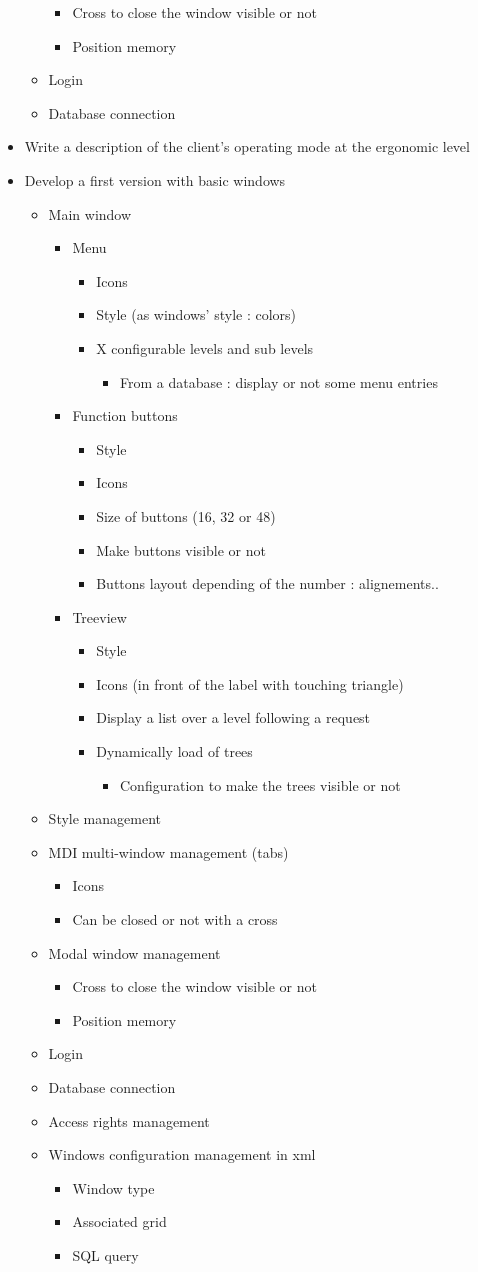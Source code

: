 \documentclass[a4paper, 12pt, french]{article}
\newcommand{\bdot}{\item[\color{ssiYellow}\ding{108}]}
\newcommand{\bdotoutlined}{\item[\color{ssiYellow}\ding{109}]}
\newcommand{\bsquare}{\item[\color{ssiYellow}\ding{110}]}
\newcommand{\bsquareoutlined}{\item[\color{ssiYellow}\ding{111}]}
\newcommand{\bdiamond}{\item[\color{ssiYellow}\ding{117}]}
\begin{document}
\begin{itemize}
\begin{itemize}
\begin{itemize}
								\bsquare{Cross to close the window visible or not}
								\bsquare{Position memory}
							\end{itemize}
						\bdotoutlined{Login}
						\bdotoutlined{Database connection}
					\end{itemize}
				\bdot{Write a description of the client's operating mode at the ergonomic level}
				\bdot{Develop a first version with basic windows}
					\begin{itemize}
						\bdotoutlined{Main window}
							\begin{itemize}
								\bsquare{Menu}
									\begin{itemize}
										\bsquareoutlined{Icons}
										\bsquareoutlined{Style (as windows' style : colors)}
										\bsquareoutlined{X configurable levels and sub levels}
											\begin{itemize}
												\bdiamond{From a database : display or not some menu entries}
											\end{itemize}
									\end{itemize}
								\bsquare{Function buttons}
									\begin{itemize}
										\bsquareoutlined{Style}
										\bsquareoutlined{Icons}
										\bsquareoutlined{Size of buttons (16, 32 or 48)}
										\bsquareoutlined{Make buttons visible or not}
										\bsquareoutlined{Buttons layout depending of the number : alignements..}
									\end{itemize}
								\bsquare{Treeview}
									\begin{itemize}
										\bsquareoutlined{Style}
										\bsquareoutlined{Icons (in front of the label with touching triangle)}
										\bsquareoutlined{Display a list over a level following a request}
										\bsquareoutlined{Dynamically load of trees}
											\begin{itemize}
												\bdiamond{Configuration to make the trees visible or not}
											\end{itemize}
									\end{itemize}
							\end{itemize}
						\bdotoutlined{Style management}
						\bdotoutlined{MDI multi-window management (tabs)}
							\begin{itemize}
								\bsquare{Icons}
								\bsquare{Can be closed or not with a cross}
							\end{itemize}
						\bdotoutlined{Modal window management}
							\begin{itemize}
								\bsquare{Cross to close the window visible or not}
								\bsquare{Position memory}
							\end{itemize}
						\bdotoutlined{Login}
						\bdotoutlined{Database connection}
						\bdotoutlined{Access rights management}
						\bdotoutlined{Windows configuration management in xml}
							\begin{itemize}
								\bsquare{Window type}
								\bsquare{Associated grid}
								\bsquare{SQL query}
							\end{itemize}
					\end{itemize}
			\end{itemize}
\end{document}
